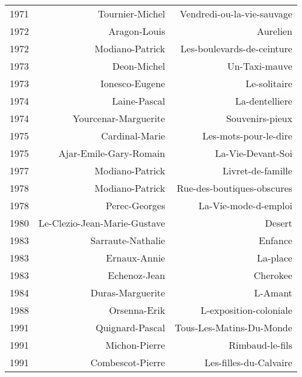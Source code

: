 \begin{xltabular}{\textwidth}{lrr}
1971 &                      Tournier-Michel &            Vendredi-ou-la-vie-sauvage \\
1972 &                         Aragon-Louis &                              Aurelien \\
1972 &                      Modiano-Patrick &            Les-boulevards-de-ceinture \\
1973 &                          Deon-Michel &                         Un-Taxi-mauve \\
1973 &                       Ionesco-Eugene &                          Le-solitaire \\
1974 &                         Laine-Pascal &                        La-dentelliere \\
1974 &                 Yourcenar-Marguerite &                       Souvenirs-pieux \\
1975 &                       Cardinal-Marie &                 Les-mots-pour-le-dire \\
1975 &               Ajar-Emile-Gary-Romain &                     La-Vie-Devant-Soi \\
1977 &                      Modiano-Patrick &                     Livret-de-famille \\
1978 &                      Modiano-Patrick &            Rue-des-boutiques-obscures \\
1978 &                        Perec-Georges &                  La-Vie-mode-d-emploi \\
1980 &         Le-Clezio-Jean-Marie-Gustave &                                Desert \\
1983 &                    Sarraute-Nathalie &                               Enfance \\
1983 &                         Ernaux-Annie &                              La-place \\
1983 &                         Echenoz-Jean &                              Cherokee \\
1984 &                     Duras-Marguerite &                               L-Amant \\
1988 &                         Orsenna-Erik &                L-exposition-coloniale \\
1991 &                      Quignard-Pascal &              Tous-Les-Matins-Du-Monde \\
1991 &                        Michon-Pierre &                       Rimbaud-le-fils \\
1991 &                     Combescot-Pierre &                Les-filles-du-Calvaire \\

\end{xltabular}
